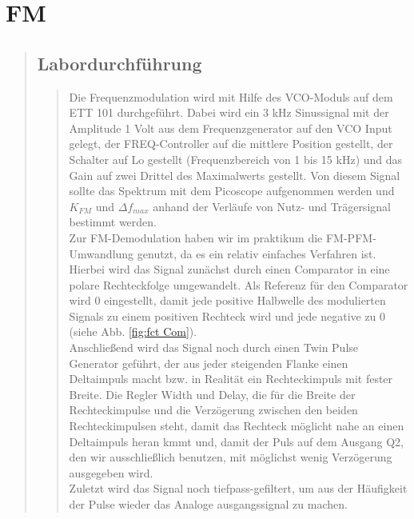 \section{FM}
\begin{quote}
    
    
    \subsection{Labordurchführung}
    \begin{quote}
    
        Die Frequenzmodulation wird mit Hilfe des VCO-Moduls auf dem ETT 101 durchgeführt. Dabei wird ein 3 kHz Sinussignal mit
        der Amplitude 1 Volt aus dem Frequenzgenerator auf den VCO Input gelegt, der FREQ-Controller auf die mittlere Position
        gestellt, der Schalter auf Lo gestellt (Frequenzbereich von 1 bis 15 kHz) und das Gain auf zwei Drittel des Maximalwerts
        gestellt.
        Von diesem Signal sollte das Spektrum mit dem Picoscope aufgenommen werden und $K_{FM}$ und $\Delta f_{max}$ anhand der
        Verläufe von Nutz- und Trägersignal bestimmt werden.\\
        Zur FM-Demodulation haben wir im praktikum die FM-PFM-Umwandlung genutzt, da es ein relativ einfaches Verfahren ist.
        Hierbei wird das Signal zunächst durch einen Comparator in eine polare Rechteckfolge umgewandelt.
        Als Referenz für den Comparator wird \si{0}{\volt} eingestellt, damit jede positive Halbwelle des modulierten Signals zu
        einem positiven Rechteck wird und jede negative zu \si{0}{\volt} (siehe Abb.
        \ref{fig:fct Com}).\\
        Anschließend wird das Signal noch durch einen Twin Pulse Generator geführt, der aus jeder steigenden Flanke einen
        Deltaimpuls macht bzw. in Realität ein Rechteckimpuls mit fester Breite. Die Regler Width und Delay, die für die Breite
        der Rechteckimpulse und die Verzögerung zwischen den beiden Rechteckimpulsen steht, damit das Rechteck möglicht nahe an
        einen Deltaimpuls heran kmmt und, damit der Puls auf dem Ausgang Q2, den wir ausschließlich benutzen, mit möglichst wenig
        Verzögerung ausgegeben wird.\\
        Zuletzt wird das Signal noch tiefpass-gefiltert, um aus der Häufigkeit der Pulse wieder das Analoge ausgangssignal zu
        machen.
        
    \end{quote}
    

\end{quote}
